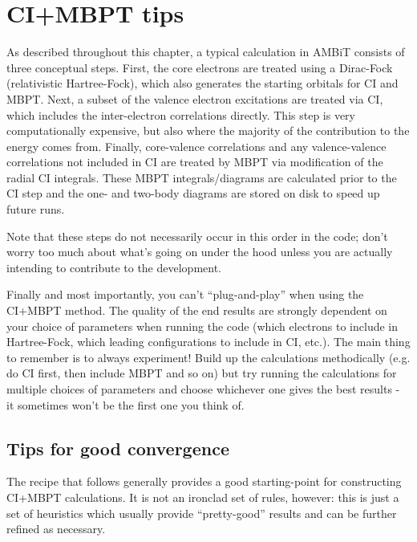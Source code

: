 \documentclass{report}
\begin{document}
\section{CI+MBPT tips}
\label{sec:CI_tips}

As described throughout this chapter, a typical calculation in AMBiT consists of three conceptual steps.
First, the core electrons are treated using a Dirac-Fock (relativistic
Hartree-Fock), which also generates the starting orbitals for CI and
MBPT. Next, a subset of the valence electron excitations are treated via
CI, which includes the inter-electron correlations directly. This step
is very computationally expensive, but also where the majority of the
contribution to the energy comes from. Finally, core-valence
correlations and any valence-valence correlations not included in CI are
treated by MBPT via modification of the radial CI integrals. These MBPT
integrals/diagrams are calculated prior to the CI step and the one- and
two-body diagrams are stored on disk to speed up future runs.

Note that these steps do not necessarily occur in this order in
the code; don't worry too much about what's going on under the hood
unless you are actually intending to contribute to the development.

Finally and most importantly, you can't ``plug-and-play'' when using the CI+MBPT method. The quality of 
the end results are strongly
dependent on your choice of parameters when running the code (which
electrons to include in Hartree-Fock, which leading configurations to
include in CI, etc.). The main thing to remember is to always
experiment! Build up the calculations methodically (e.g. do CI first,
then include MBPT and so on) but try running the calculations for
multiple choices of parameters and choose whichever one gives the best
results - it sometimes won't be the first one you think of.

\subsection{Tips for good convergence}

The recipe that follows generally provides a good starting-point for constructing CI+MBPT calculations.
It is not an ironclad set of rules, however: this is just a set of heuristics which usually provide
``pretty-good'' results and can be further refined as necessary. 
\end{document}
